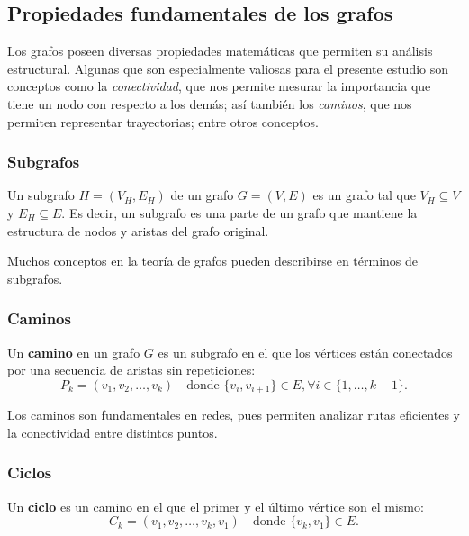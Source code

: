 \documentclass[11pt]{article}
\begin{document}
		\subsection{Propiedades fundamentales de los grafos}
			Los grafos poseen diversas propiedades matemáticas que permiten su análisis estructural.
			Algunas que son especialmente valiosas para el presente estudio son conceptos como la \textit{conectividad}, que nos permite mesurar la importancia que tiene un nodo con respecto a los demás; así también los \textit{caminos}, que nos permiten representar trayectorias; entre otros conceptos.

			\subsubsection{Subgrafos}

			Un subgrafo $H = (V_H, E_H)$ de un grafo $G = (V, E)$ es un grafo tal que $V_H \subseteq V$ y $E_H \subseteq E$.
			Es decir, un subgrafo es una parte de un grafo que mantiene la estructura de nodos y aristas del grafo original.

			Muchos conceptos en la teoría de grafos pueden describirse en términos de subgrafos.

			\subsubsection{Caminos}

			Un \textbf{camino} en un grafo $G$ es un subgrafo en el que los vértices están conectados por una secuencia de aristas sin repeticiones:
			\begin{equation}
				P_k = (v_1, v_2, \dots, v_k) \quad \text{donde } \{v_i, v_{i+1}\} \in E, \forall i \in \{1, \dots, k-1\}.
			\end{equation}

			Los caminos son fundamentales en redes, pues permiten analizar rutas eficientes y la conectividad entre distintos puntos.

			\subsubsection{Ciclos}

			Un \textbf{ciclo} es un camino en el que el primer y el último vértice son el mismo:
			\begin{equation}
				C_k = (v_1, v_2, \dots, v_k, v_1) \quad \text{donde } \{v_k, v_1\} \in E.
			\end{equation}
\end{document}
